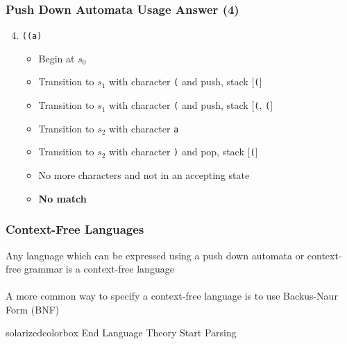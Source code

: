 \documentclass[aspectratio=169]{beamer}
\begin{document}
\begin{frame}
\frametitle{Push Down Automata Usage Answer (4)}

\pda{}

\begin{enumerate}
  \setcounter{enumi}{3}
  \item \lstinline{((a)}
    \begin{itemize}
      \item Begin at $s_0$
      \item Transition to $s_1$ with character \lstinline{(} and push, stack
        [\lstinline{(}]
      \item Transition to $s_1$ with character \lstinline{(} and push, stack
        [\lstinline{(}, \lstinline{(}]
      \item Transition to $s_2$ with character \lstinline{a}
      \item Transition to $s_2$ with character \lstinline{)} and pop, stack
        [\lstinline{(}]
      \item No more characters and not in an accepting state
      \item \textbf{No match}
    \end{itemize}
\end{enumerate}
\end{frame}

\begin{frame}
\frametitle{Context-Free Languages}

Any language which can be expressed using a \alert{push down automata} or
\alert{context-free grammar} is a \alert{context-free language}\\~\\

A more common way to specify a \alert{context-free language} is to use
\alert{Backus-Naur Form} (BNF)
\end{frame}

\begin{frame}
  \begin{beamercolorbox}[wd=\paperwidth, sep=2em]{solarizedcolorbox}
    {End Language Theory \hfill
    Start Parsing}
  \end{beamercolorbox}
\end{frame}
\end{document}
